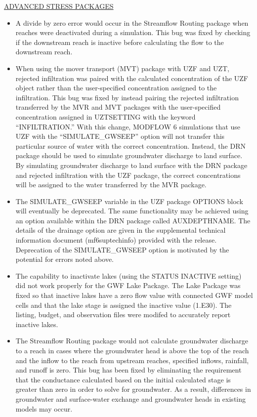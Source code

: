 	\underline{ADVANCED STRESS PACKAGES}
	\begin{itemize}
		\item A divide by zero error would occur in the Streamflow Routing package when reaches were deactivated during a simulation. This bug was fixed by checking if the downstream reach is inactive before calculating the flow to the downstream reach.
		\item When using the mover transport (MVT) package with UZF and UZT, rejected infiltration was paired with the calculated concentration of the UZF object rather than the user-specified concentration assigned to the infiltration.  This bug was fixed by instead pairing the rejected infiltration transferred by the MVR and MVT packages with the user-specified concentration assigned in UZTSETTING with the keyword ``INFILTRATION.''  With this change, MODFLOW 6 simulations that use UZF with the ``SIMULATE\_GWSEEP'' option will not transfer this particular source of water with the correct concentration.  Instead, the DRN package should be used to simulate groundwater discharge to land surface.  By simulating groundwater discharge to land surface with the DRN package and rejected infiltration with the UZF package, the correct concentrations will be assigned to the water transferred by the MVR package.
		\item The SIMULATE\_GWSEEP variable in the UZF package OPTIONS block will eventually be deprecated.  The same functionality may be achieved using an option available within the DRN package called AUXDEPTHNAME.  The details of the drainage option are given in the supplemental technical information document (mf6suptechinfo) provided with the release.  Deprecation of the SIMULATE\_GWSEEP option is motivated by the potential for errors noted above.
		\item The capability to inactivate lakes (using the STATUS INACTIVE setting) did not work properly for the GWF Lake Package.  The Lake Package was fixed so that inactive lakes have a zero flow value with connected GWF model cells and that the lake stage is assigned the inactive value (1.E30).  The listing, budget, and observation files were modifed to accurately report inactive lakes.
		\item The Streamflow Routing package would not calculate groundwater discharge to a reach in cases where the groundwater head is above the top of the reach and the inflow to the reach from upstream reaches, specified inflows, rainfall, and runoff is zero. This bug has been fixed by eliminating the requirement that the conductance calculated based on the initial calculated stage is greater than zero in order to solve for groundwater. As a result, differences in groundwater and surface-water exchange and groundwater heads in existing models may occur.  

\end{itemize}
